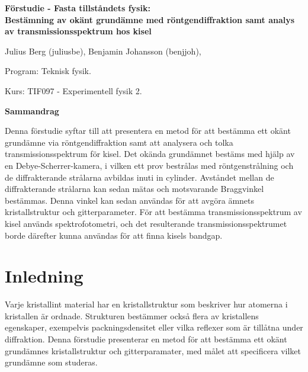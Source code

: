 \documentclass[12pt, a4paper]{article}
\begin{document}
\thispagestyle{empty}
\begin{center}
{\huge\bf Förstudie - Fasta tillståndets fysik:\\}
\vspace{1.0cm}
{\Large\bf 
Bestämning av okänt grundämne med röntgendiffraktion samt analys av transmissionsspektrum hos kisel}
\end{center}
\vspace{1.0cm}
\begin{center}
Julius Berg (juliusbe), Benjamin Johansson (benjjoh), \par
Program: Teknisk fysik. \par
Kurs: TIF097 - Experimentell fysik 2.
\end{center}
\vspace{1.0cm}
\centerline{\bf Sammandrag}
Denna förstudie syftar till att presentera en metod för att bestämma ett okänt grundämne via röntgendiffraktion samt att analysera och tolka transmissionsspektrum för kisel. Det okända grundämnet bestäms med hjälp av en Debye-Scherrer-kamera, i vilken ett prov bestrålas med röntgenstrålning och de diffrakterande strålarna avbildas inuti in cylinder. Avståndet mellan de diffrakterande strålarna kan sedan mätas och motsvarande Braggvinkel bestämmas. Denna vinkel kan sedan användas för att avgöra ämnets kristallstruktur och gitterparameter. För att bestämma transmissionsspektrum av kisel används spektrofotometri, och det resulterande transmissionsspektrumet borde därefter kunna användas för att finna kisels bandgap. 
\newpage
\tableofcontents
\newpage

\section{Inledning}

Varje kristallint material har en kristallstruktur som beskriver hur atomerna i kristallen är ordnade. 
Strukturen bestämmer också flera av kristallens egenskaper, exempelvis packningsdensitet eller vilka reflexer som är tillåtna under diffraktion\cite{Hofmann}. 
Denna förstudie presenterar en metod för att bestämma ett okänt grundämnes kristallstruktur och gitterparamater, med målet att specificera vilket grundämne som studeras.
\end{document}
